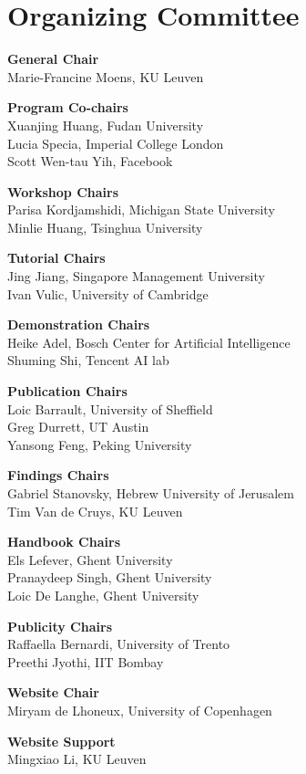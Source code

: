 
\section{Organizing Committee}

\setlength{\parindent}{0pt}

{\bf General Chair} \\
Marie-Francine Moens, KU Leuven

{\bf Program Co-chairs} \\
Xuanjing Huang, Fudan University\\
Lucia Specia, Imperial College London\\
Scott Wen-tau Yih, Facebook

{\bf Workshop Chairs} \\
Parisa Kordjamshidi, Michigan State University\\
Minlie Huang, Tsinghua University

{\bf Tutorial Chairs} \\
Jing Jiang, Singapore Management University \\
Ivan Vulic, University of Cambridge

{\bf Demonstration Chairs} \\
Heike Adel, Bosch Center for Artificial Intelligence \\
Shuming Shi, Tencent AI lab

{\bf Publication Chairs} \\
Loic Barrault, University of Sheffield \\
Greg Durrett, UT Austin \\
Yansong Feng, Peking University

{\bf Findings Chairs} \\
Gabriel Stanovsky, Hebrew University of Jerusalem \\
Tim Van de Cruys, KU Leuven

{\bf Handbook Chairs} \\
Els Lefever, Ghent University\\
Pranaydeep Singh, Ghent University\\
Loic De Langhe, Ghent University

{\bf Publicity Chairs} \\
Raffaella Bernardi, University of Trento \\
Preethi Jyothi, IIT Bombay

{\bf Website Chair} \\
Miryam de Lhoneux, University of Copenhagen

{\bf Website Support} \\
Mingxiao Li, KU Leuven

